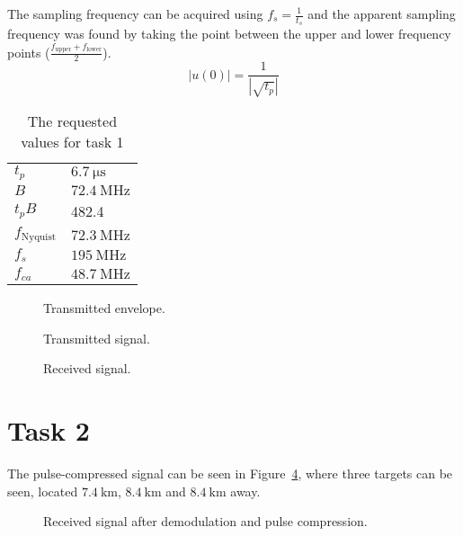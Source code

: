 \documentclass[12pt,a4paper]{article}
\begin{document}
The sampling frequency can be acquired using $f_s=\frac{1}{t_s}$ and the apparent sampling frequency was found by taking the point between the upper and lower frequency points ($\frac{f_\text{upper}+f_\text{lower}}{2}$).
\begin{equation}
  \label{eq:pulse_width}
  |u(0)|=\frac{1}{|\sqrt{t_p}|}
\end{equation}
\begin{table}[h]
  \centering
  \begin{tabular}{|l|l|}\hline
    $t_p$ & $\SI{6.7}{\micro\second}$ \\
    $B$ & $\SI{72.4}{\mega\hertz}$ \\
    $t_pB$ & 482.4 \\
    $f_\text{Nyquist}$ & $\SI{72.3}{\mega\hertz}$ \\
    $f_s$ & $\SI{195}{\mega\hertz}$ \\
    $f_{ca}$ & $\SI{48.7}{\mega\hertz}$ \\ \hline
  \end{tabular}
  \caption{The requested values for task 1}
  \label{tab:task1}
\end{table}
\begin{figure}[h]
  \centering
  \noindent\makebox[\textwidth]{\scalebox{0.90}{}}
  \caption{Transmitted envelope.}
  \label{fig:task1_ut}
\end{figure}
\begin{figure}[h]
  \centering
  \noindent\makebox[\textwidth]{\scalebox{0.90}{}}
  \caption{Transmitted signal.}
  \label{fig:task1_st}
\end{figure}
\begin{figure}[h]
  \centering
  \noindent\makebox[\textwidth]{\scalebox{0.90}{}}
  \caption{Received signal.}
  \label{fig:task1_sr}
\end{figure}

\section{Task 2}\label{sec:2}
The pulse-compressed signal can be seen in Figure~\ref{fig:task2}, where three targets can be seen, located $\SI{7.4}{\kilo\meter}$, $\SI{8.4}{\kilo\meter}$ and $\SI{8.4}{\kilo\meter}$ away.
\begin{figure}[h]
  \centering
  \noindent\makebox[\textwidth]{\scalebox{0.90}{}}
  \caption{Received signal after demodulation and pulse compression.}
  \label{fig:task2}
\end{figure}
\end{document}
